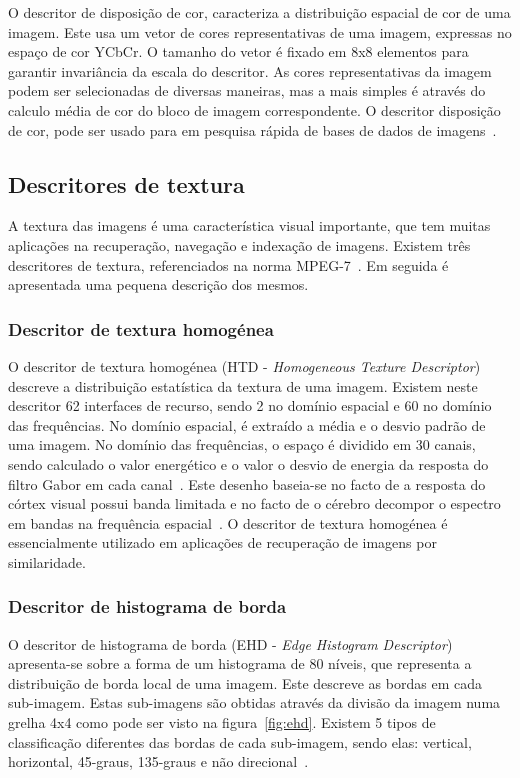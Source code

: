 O descritor de disposição de cor, caracteriza a distribuição espacial de cor de uma imagem. Este usa um vetor de cores representativas de uma imagem, expressas no espaço de cor YCbCr. O tamanho do vetor é fixado em 8x8 elementos para garantir invariância da escala do descritor. As cores representativas da imagem podem ser selecionadas de diversas maneiras, mas a mais simples é através do calculo média de cor do bloco de imagem correspondente. O descritor disposição de cor, pode ser usado para em pesquisa rápida de bases de dados de imagens~\cite{Cieplinski2001}.


\subsection{Descritores de textura}

A textura das imagens é uma característica visual importante, que tem muitas aplicações na recuperação, navegação e indexação de imagens. Existem três descritores de textura, referenciados na norma MPEG-7~\cite{Wu2001}. Em seguida é apresentada uma pequena descrição dos mesmos.

\subsubsection{Descritor de textura homogénea}

O descritor de textura homogénea (HTD - \textit{Homogeneous Texture Descriptor}) descreve a distribuição estatística da textura de uma imagem. Existem neste descritor 62 interfaces de recurso, sendo 2 no domínio espacial e 60 no domínio das frequências. No domínio espacial, é extraído a média e o desvio padrão de uma imagem. No domínio das frequências, o espaço é dividido em 30 canais, sendo calculado o valor energético e o valor o desvio de energia da resposta do filtro Gabor em cada canal~\cite{Wu2001, Shao2009}. Este desenho baseia-se no facto de a resposta do córtex visual possui banda limitada e no facto de o cérebro decompor o espectro em bandas na frequência espacial~\cite{Wu2001}.
O descritor de textura homogénea é essencialmente utilizado em aplicações de recuperação de imagens por similaridade. 

\subsubsection{Descritor de histograma de borda}

O descritor de histograma de borda (EHD - \textit{Edge Histogram Descriptor}) apresenta-se sobre a forma de um histograma de 80 níveis, que representa a distribuição de borda local de uma imagem. Este descreve as bordas em cada sub-imagem. Estas sub-imagens são obtidas através da divisão da imagem numa grelha 4x4 como pode ser visto na figura~\ref{fig:ehd}. Existem 5 tipos de classificação diferentes das bordas de cada sub-imagem, sendo elas: vertical, horizontal, 45-graus, 135-graus e não direcional~\cite{Wu2001}. 

